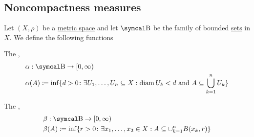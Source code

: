 \subsection{Noncompactness measures}\label{subsec:noncompactness_measures}

\begin{definition}\label{def:noncompactness_measures}
  Let \( (X, \rho) \) be a \hyperref[def:metric_space]{metric space} and let \( \CB \) be the family of bounded \hyperref[def:metric_space/bounded_set]{sets} in \( X \). We define the following functions
  \begin{DefEnum}
     The ,
    \begin{align*}
       & \alpha: \CB \to [0, \infty)                                                                                                            \\
       & \alpha(A) \coloneqq \inf \{d > 0 \colon \exists U_1, \ldots, U_n \subseteq X: \Diam {U_k} < d \Tand A \subseteq \bigcup_{k=1}^n U_k \}
    \end{align*}

     The ,
    \begin{align*}
       & \beta: \CB \to [0, \infty)                                                                                   \\
       & \beta(A) \coloneqq \inf \{r > 0 \colon \exists x_1, \ldots, x_2 \in X: A \subseteq \cup_{k=1}^n B(x_k, r) \}
    \end{align*}
  \end{DefEnum}
\end{definition}

